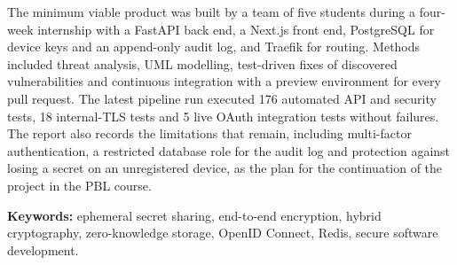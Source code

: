 \documentclass[12pt,a4paper]{article}
\numberwithin{equation}{section}
\numberwithin{figure}{section}
\numberwithin{table}{section}
\begin{document}
The minimum viable product was built by a team of five students during a four-week internship with a FastAPI back end, a Next.js front end, PostgreSQL for device keys and an append-only audit log, and Traefik for routing. Methods included threat analysis, UML modelling, test-driven fixes of discovered vulnerabilities and continuous integration with a preview environment for every pull request. The latest pipeline run executed 176 automated API and security tests, 18 internal-TLS tests and 5 live OAuth integration tests without failures. The report also records the limitations that remain, including multi-factor authentication, a restricted database role for the audit log and protection against losing a secret on an unregistered device, as the plan for the continuation of the project in the PBL course.

\vspace{0.6cm}
\noindent
\textbf{Keywords:} ephemeral secret sharing, end-to-end encryption, hybrid cryptography, zero-knowledge storage, OpenID Connect, Redis, secure software development.
\end{document}
